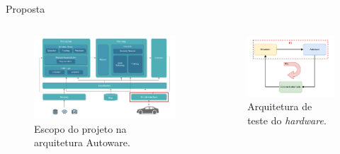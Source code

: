 \documentclass{if-beamer}
\begin{document}
\begin{frame}{Proposta}
	
	\begin{columns}
		
		\begin{column}{0.6\textwidth}
			
				\begin{figure}[H]
				\centering
				\includegraphics[width=\linewidth]{img/architecture.png}
				\caption{Escopo do projeto na arquitetura Autoware.}
				\label{fig:architecture}
			\end{figure}
			
		\end{column}
		
		\begin{column}{0.4\textwidth}
			
				\begin{figure}[H]
				\centering
				\includegraphics[width=\linewidth]{img/architecture_HIL}
				\caption{Arquitetura de teste do \textit{hardware}.}
				\label{fig:architecture_HIL}
			\end{figure}
			
		\end{column}
		
	\end{columns}
	
\end{frame}
\end{document}
